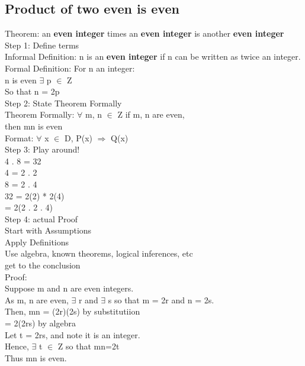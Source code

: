 \documentclass[11pt]{article}
\begin{document}
\subsection{Product of two even is even}
\label{sec:orgee7ff08}
Theorem: an \textbf{even integer} times an \textbf{even integer} is another \textbf{even integer}\\

Step 1: Define terms\\
Informal Definition: n is an \textbf{even integer} if n can be written as twice an integer.\\
Formal Definition: For n an integer:\\
n is even \iff \(\exists\) p \(\in\) Z\\
So that n = 2p\\

Step 2: State Theorem Formally\\
Theorem Formally: \(\forall\) m, n \(\in\) Z if m, n are even,\\
then mn is even\\

Format: \(\forall\) x \(\in\) D, P(x) \(\Rightarrow\) Q(x)\\

Step 3: Play around!\\
4 . 8 = 32\\
4 =  2 . 2\\
8 = 2 . 4\\
32 = 2(2) * 2(4)\\
= 2(2 . 2 . 4)\\

Step 4: actual Proof\\

Start with Assumptions\\

Apply Definitions\\

Use algebra, known theorems, logical inferences, etc\\

get to the conclusion\\

Proof:\\
Suppose m and n are even integers.\\
As m, n are even, \(\exists\) r and \(\exists\) s so that m = 2r and n = 2s.\\
Then, mn = (2r)(2s) by substitutiion\\
= 2(2rs) by algebra\\
Let t = 2rs, and note it is an integer.\\
Hence, \(\exists\) t \(\in\) Z so that mn=2t\\
Thus mn is even.\\
\end{document}
